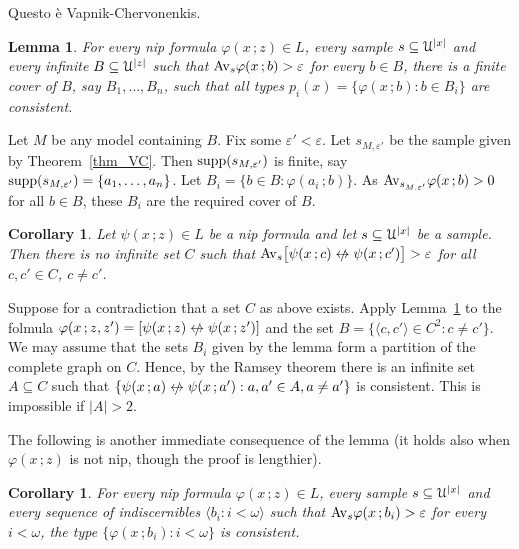 \documentclass[10pt,openany]{article}
\def\supp{\mathop{\rm supp}}
\def\niff{\mathrel{{\leftrightarrow}\llap{\raisebox{-.1ex}{{\small$/$}}\hskip.5ex}}}
\def\U{\EuScript U}
\def\<{\langle}
\def\>{\rangle}
\def\phi{\varphi}
\def\epsilon{\varepsilon}
\newcounter{thm}[section]
\theoremstyle{mio}
\newtheorem{corollary}[thm]{Corollary}
\newtheorem{lemma}[thm]{Lemma}
\theoremstyle{liscio}
\def\QED{\noindent\nolinebreak[4]\hspace{\stretch{1}}\rlap{\ \ $\Box$}\medskip}
\renewenvironment{proof}[1][Proof]%
{\begin{trivlist}\item[\hskip\labelsep {\bf #1}]}
{\QED\end{trivlist}}
\begin{document}
\begin{proof}
  Questo è Vapnik-Chervonenkis.
\end{proof}


\begin{lemma}\label{lem_cons}
  For every nip formula $\phi(x\,;z)\in L$, every sample $s\subseteq\U^{|x|}$ and every infinite $B\subseteq\U^{|z|}$ such that $\Av_s\phi(x\,;b)>\epsilon$ for every $b\in B$, there is a finite cover of $B$, say $B_1,\dots, B_n$, such that all types $p_i(x)=\{\phi(x\,;b):b\in B_i\}$ are consistent.
\end{lemma}

\begin{proof}
  Let $M$ be any model containing $B$.
  Fix some $\epsilon'<\epsilon$.
  Let $s_{M,\epsilon'}$ be the sample given by Theorem~\ref{thm_VC}.
  Then $\supp(s_{M,\epsilon'})$ is finite, say $\supp(s_{M,\epsilon'})=\{a_1,\dots,a_n\}$.
  Let $B_i=\{b\in B:\phi(a_i\,;b)\}$.
  As $\Av_{s_{M.\epsilon'}}\phi(x\,;b)>0$ for all $b\in B$, these $B_i$ are the required cover of $B$.
\end{proof}


\begin{corollary}
  Let $\psi(x\,;z)\in L$ be a nip formula and let $s\subseteq\U^{|x|}$ be a sample.
  Then there is no infinite set $C$ such that $\Av_s\big[\psi(x\,;c)\niff\psi(x\,;c')\big]>\epsilon$ for all $c,c'\in C$, $c\neq c'$.
\end{corollary}

\begin{proof}
  Suppose for a contradiction that a set $C$ as above exists. Apply Lemma~\ref{lem_cons} to the folmula $\phi(x\,;z,z') = [\psi(x\,;z)\niff\psi(x\,;z')]$ and the set $B=\{\<c,c'\>\in C^2:c\neq c'\}$.
  We may assume that the sets $B_i$ given by the lemma form a partition of the complete graph on $C$.
  Hence, by the Ramsey theorem there is an infinite set $A\subseteq C$ such that $\{\psi(x\,;a)\niff\psi(x\,;a') : a,a'\in A, a\neq a'\}$ is consistent. This is impossible if $|A|>2$.
\end{proof}

The following is another immediate consequence of the lemma (it holds also when $\phi(x\,;z)$ is not nip, though the proof is lengthier).

\begin{corollary}
  For every nip formula $\phi(x\,;z)\in L$, every sample $s\subseteq\U^{|x|}$ and every sequence of indiscernibles $\<b_i:i<\omega\>$ such that $\Av_s\phi(x\,;b_i)>\epsilon$ for every $i<\omega$, the type $\{\phi(x\,;b_i):i<\omega\}$ is consistent.\QED
\end{corollary}
\end{document}
